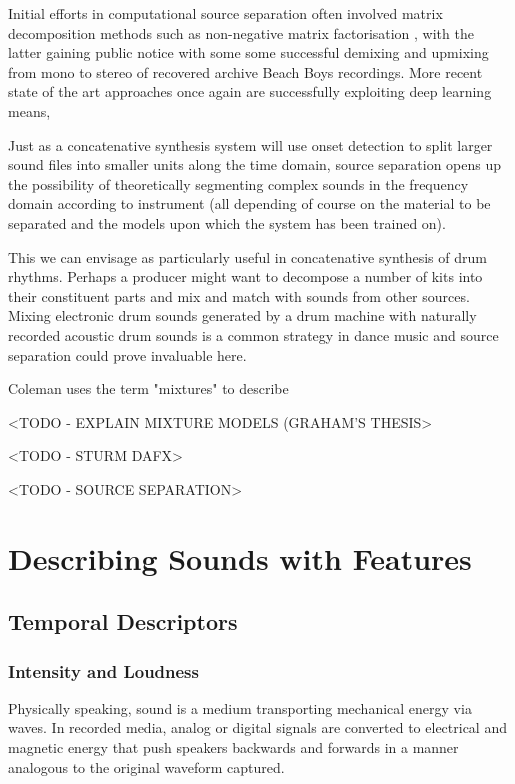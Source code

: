 {{Initial efforts in computational source separation often involved matrix decomposition methods such as non-negative matrix factorisation ,  with the latter gaining public notice with some some successful demixing and upmixing from mono to stereo of recovered archive Beach Boys recordings. More recent state of the art approaches once again are successfully exploiting deep learning means,  

Just as a concatenative synthesis system will use onset detection to split larger sound files into smaller units along the time domain, source separation opens up the possibility of theoretically segmenting complex sounds in the frequency domain according to instrument (all depending of course on the material to be separated and the models upon which the system has been trained on).

This we can envisage as particularly useful in concatenative synthesis of drum rhythms. Perhaps a producer might want to decompose a number of kits into their constituent parts and mix and match with sounds from other sources. Mixing electronic drum sounds generated by a drum machine with naturally recorded acoustic drum sounds is a common strategy in dance music and source separation could prove invaluable here.

Coleman uses the term "mixtures" to describe 

<TODO - EXPLAIN MIXTURE MODELS (GRAHAM’S THESIS>

<TODO - STURM DAFX>

<TODO - SOURCE SEPARATION>

\section{Describing Sounds with Features}

\subsection{Temporal Descriptors}

\subsubsection{Intensity and Loudness}

Physically speaking, sound is a medium transporting mechanical energy via waves. In recorded media, analog or digital signals are converted to electrical and magnetic energy that push speakers backwards and forwards in a manner analogous to the original waveform captured.

}}
